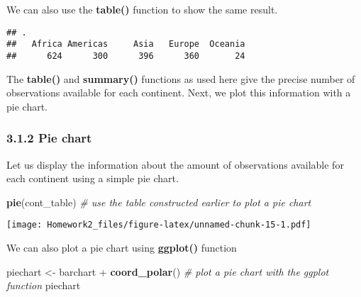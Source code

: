 \documentclass[]{article}
\newenvironment{Shaded}{\begin{snugshade}}{\end{snugshade}}
\newcommand{\KeywordTok}[1]{\textcolor[rgb]{0.13,0.29,0.53}{\textbf{{#1}}}}
\newcommand{\StringTok}[1]{\textcolor[rgb]{0.31,0.60,0.02}{{#1}}}
\newcommand{\CommentTok}[1]{\textcolor[rgb]{0.56,0.35,0.01}{\textit{{#1}}}}
\newcommand{\NormalTok}[1]{{#1}}
\begin{document}
We can also use the \textbf{table()} function to show the same result.

\begin{Shaded}
\end{Shaded}

\begin{verbatim}
## .
##   Africa Americas     Asia   Europe  Oceania 
##      624      300      396      360       24
\end{verbatim}

The \textbf{table()} and \textbf{summary()} functions as used here give
the precise number of observations available for each continent. Next,
we plot this information with a pie chart.

\subsubsection{\texorpdfstring{3.1.2 \textbf{Pie
chart}}{3.1.2 Pie chart}}\label{pie-chart}

Let us display the information about the amount of observations
available for each continent using a simple pie chart.

\begin{Shaded}
\begin{Highlighting}[]
\KeywordTok{pie}\NormalTok{(cont_table) }\CommentTok{# use the table constructed earlier to plot a pie chart}
\end{Highlighting}
\end{Shaded}

\texttt{[image: Homework2\_files/figure-latex/unnamed-chunk-15-1.pdf]}

We can also plot a pie chart using \textbf{ggplot()} function

\begin{Shaded}
\begin{Highlighting}[]
\NormalTok{piechart <-}\StringTok{ }\NormalTok{barchart +}\StringTok{ }\KeywordTok{coord_polar}\NormalTok{() }\CommentTok{# plot a pie chart with the ggplot function}
\NormalTok{piechart}
\end{Highlighting}
\end{Shaded}
\end{document}

